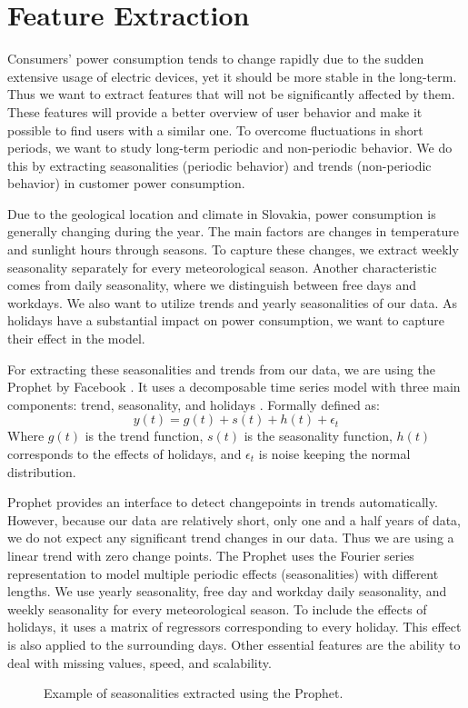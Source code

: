 \section{Feature Extraction}
Consumers' power consumption tends to change rapidly due to the sudden extensive usage of electric devices, yet it should be more stable in the long-term. Thus we want to extract features that will not be significantly affected by them. These features will provide a better overview of user behavior and make it possible to find users with a similar one. To overcome fluctuations in short periods, we want to study long-term periodic and non-periodic behavior. We do this by extracting seasonalities (periodic behavior) and trends (non-periodic behavior) in customer power consumption.

Due to the geological location and climate in Slovakia, power consumption is generally changing during the year. The main factors are changes in temperature and sunlight hours through seasons. To capture these changes, we extract weekly seasonality separately for every meteorological season. Another characteristic comes from daily seasonality, where we distinguish between free days and workdays. We also want to utilize trends and yearly seasonalities of our data. As holidays have a substantial impact on power consumption, we want to capture their effect in the model.

For extracting these seasonalities and trends from our data, we are using the Prophet by Facebook \cite{exp:FbProphet}. It uses a decomposable time series model with three main components: trend, seasonality, and holidays \cite{exp:lin-model}. Formally defined as:
\begin{equation}
    y(t) = g(t) + s(t) + h(t) + \epsilon_t    
\end{equation}
Where $g(t)$ is the trend function, $s(t)$ is the seasonality function, $h(t)$ corresponds to the effects of holidays, and $\epsilon_t$ is noise keeping the normal distribution.

Prophet provides an interface to detect changepoints in trends automatically. However, because our data are relatively short, only one and a half years of data, we do not expect any significant trend changes in our data. Thus we are using a linear trend with zero change points. The Prophet uses the Fourier series representation to model multiple periodic effects (seasonalities) with different lengths. We use yearly seasonality, free day and workday daily seasonality, and weekly seasonality for every meteorological season. To include the effects of holidays, it uses a matrix of regressors corresponding to every holiday. This effect is also applied to the surrounding days. Other essential features are the ability to deal with missing values, speed, and scalability.
\begin{figure}[h]
    \centering
    
    \caption{Example of seasonalities extracted using the Prophet.}
    \label{fig:seasonalities}
\end{figure}

